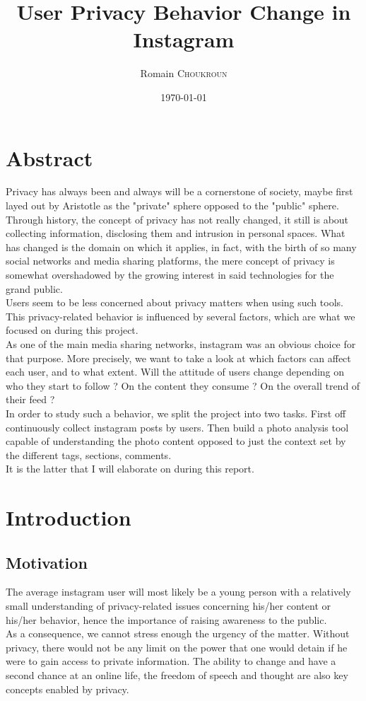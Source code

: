 \documentclass{article}
\title{User Privacy Behavior Change in Instagram}
\author{Romain \textsc{Choukroun}}
\date{\today}
\begin{document}
\maketitle

\newpage
\tableofcontents

\newpage
\section{Abstract}
    Privacy has always been and always will be a cornerstone of society, maybe first layed out by Aristotle as the "private" sphere opposed to the "public" sphere. 
    \\Through history, the concept of privacy has not really changed, it still is about collecting information, disclosing them and intrusion in personal spaces. What has changed is the domain on which it applies, in fact, with the birth of so many social networks and media sharing platforms, the mere concept of privacy is somewhat overshadowed by the growing interest in said technologies for the grand public.
    \\Users seem to be less concerned about privacy matters when using such tools. This privacy-related behavior is influenced by several factors, which are what we focused on during this project.
    \\As one of the main media sharing networks, instagram was an obvious choice for that purpose. More precisely, we want to take a look at which factors can affect each user, and to what extent. Will the attitude of users change depending on who they start to follow ? On the content they consume ? On the overall trend of their feed ?
    \\In order to study such a behavior, we split the project into two tasks. First off continuously collect instagram posts by users. Then build a photo analysis tool capable of understanding the photo content opposed to just the context set by the different tags, sections, comments.
    \\It is the latter that I will elaborate on during this report.

\newpage
\section{Introduction}
    \subsection{Motivation}
        The average instagram user will most likely be a young person with a relatively small understanding of privacy-related issues concerning his/her content or his/her behavior, hence the importance of raising awareness to the public. 
        \\As a consequence, we cannot stress enough the urgency of the matter. Without privacy, there would not be any limit on the power that one would detain if he were to gain access to private information. The ability to change and have a second chance at an online life, the freedom of speech and thought are also key concepts enabled by privacy.
\end{document}
